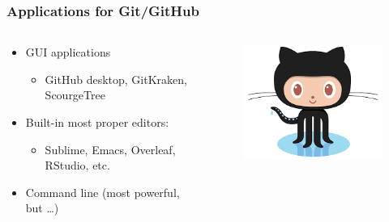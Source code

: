\documentclass[ignorenonframetext]{beamer}
\begin{document}
\begin{frame}
  \frametitle{Applications for Git/GitHub}

  \begin{columns}
      \begin{column}{.5\textwidth}
      \begin{itemize}
        \item GUI applications
          \begin{itemize}
            \item GitHub desktop, GitKraken, ScourgeTree \newline
          \end{itemize}
        \item Built-in most proper editors:
          \begin{itemize}
            \item Sublime, Emacs, Overleaf, RStudio, etc.\newline
          \end{itemize}
          \item Command line (most powerful, but \ldots)
        \end{itemize}
    \end{column}

    \begin{column}{.5\textwidth}
      \begin{figure}[h]
        \centering
        \includegraphics[width = 1\textwidth]{octopussy}
        \end{figure}
    \end{column}
  \end{columns}

\end{frame}
\end{document}
